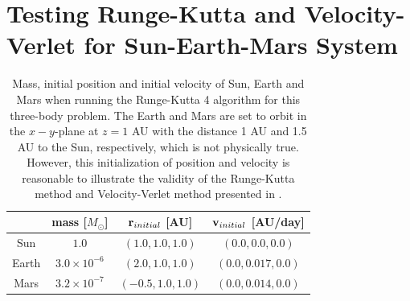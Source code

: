 \section{Testing Runge-Kutta and Velocity-Verlet for Sun-Earth-Mars System}
\label{sec:SunEarthMarsTest}

\begin{table}[H]
\centering
\caption{Mass, initial position and initial velocity of Sun, Earth and Mars when running the Runge-Kutta 4 algorithm for this three-body problem.
The Earth and Mars are set to orbit in the $x-y$-plane at $z=1$ AU with the distance 1 AU and 1.5 AU to the Sun, respectively, which is not physically true. However, this initialization of position and velocity is reasonable to illustrate the validity of the Runge-Kutta method and Velocity-Verlet method presented in .
}
\begin{center}
\begin{tabular}{ | c | c | c | c |  }
  \hline			
   & mass [$M_{\odot}$] &  $\mbox{\textbf{r}}_{initial}$ [AU] & $\mbox{\textbf{v}}_{initial}$ [AU/day]  
  \\ \hline
  Sun & $1.0$ & $(1.0,1.0,1.0)$  & $(0.0,0.0,0.0)$ 
  \\ \hline
  Earth & $3.0\times 10^{-6}$ & $(2.0,1.0,1.0)$ & $(0.0,0.017,0.0)$
  \\ \hline
  Mars & $3.2\times 10^{-7}$ & $(-0.5,1.0,1.0)$  & $(0.0,0.014,0.0)$
  \\ \hline
\end{tabular}
\end{center}
\label{tab:SunEarthMarsTest}
\end{table}

